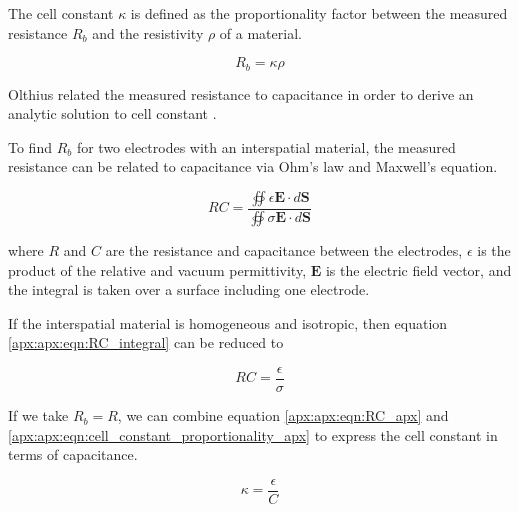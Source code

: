   \par The cell constant $\kappa$ is defined as the proportionality factor between the measured resistance $R_b$ and the resistivity $\rho$ of a material.
  
  \begin{equation}
      R_b = \kappa \rho
      \label{apx:apx:eqn:cell_constant_proportionality_apx}
  \end{equation}
  
  \noindent  Olthius related the measured resistance to capacitance in order to derive an analytic solution to cell constant \cite{olthuis_theoretical_1995}. 
  
  \par To find $R_b$ for two electrodes with an interspatial material, the measured resistance can be related to capacitance via Ohm's law and Maxwell's equation.
  
  \begin{equation}
      RC = \frac{\oiint \epsilon \boldsymbol{E} \cdot d\boldsymbol{S}}{\oiint \sigma\boldsymbol{E}\cdot d\boldsymbol{S}}
      \label{apx:apx:eqn:RC_integral}
  \end{equation}
  
  \noindent where $R$ and $C$ are the resistance and capacitance between the electrodes, $\epsilon$ is the product of the relative and vacuum permittivity, $\boldsymbol{E}$ is the electric field vector, and the integral is taken over a surface including one electrode.
  
  \par If the interspatial material is homogeneous and isotropic, then equation \ref{apx:apx:eqn:RC_integral} can be reduced to
  
  \begin{equation}
      RC = \frac{\epsilon}{\sigma}
      \label{apx:apx:eqn:RC_apx}
  \end{equation}
  
  \par If we take $R_b = R$, we can combine equation \ref{apx:apx:eqn:RC_apx} and \ref{apx:apx:eqn:cell_constant_proportionality_apx} to express the cell constant in terms of capacitance.
  
  \begin{equation}
      \kappa = \frac{\epsilon}{C}
      \label{apx:apx:eqn:cell_constant_C}
  \end{equation}
  
